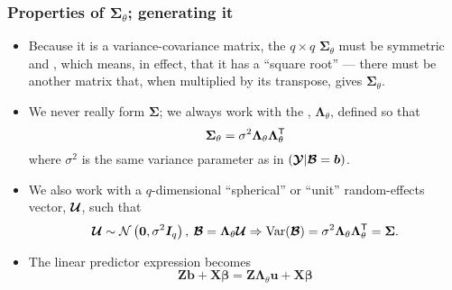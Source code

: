 \documentclass[dvipsnames,pdflatex,beamer]{beamer}
\newcommand{\bLt}{\ensuremath{\bm\Lambda_\theta}}
\begin{document}
\begin{frame}
  \frametitle{Properties of $\bm\Sigma_\theta$; generating it}
  \begin{itemize}
  \item Because it is a variance-covariance matrix, the $q\times q$ 
    $\bm\Sigma_\theta$ must be symmetric and , which means, in effect, that it has a ``square
    root'' --- there must be another matrix that, when
    multiplied by its transpose, gives $\bm\Sigma_\theta$.
  \item We never really form $\bm\Sigma$; we always work with the
    , $\bLt$,
    defined so that
    \begin{displaymath}
      \bm\Sigma_\theta=
      \sigma^2\bLt\bLt\trans
    \end{displaymath}
    where $\sigma^2$ is the same variance parameter as in $(\bm{\mathcal{Y}}|\bm{\mathcal{B}}=\bm b)$.
  \item We also work with a $q$-dimensional ``spherical'' or ``unit''
    random-effects vector, $\bm{\mathcal{U}}$, such that
    \begin{displaymath}
      \bc U\sim\mathcal{N}\left(\bm 0,\sigma^2\bm I_q\right),\:
      \bc B=\bLt\bc U\Rightarrow
      \text{Var}(\bc B)=\sigma^2\bLt\bLt\trans=\bm\Sigma .
    \end{displaymath}
  \item The linear predictor expression becomes
    \begin{displaymath}
      \bm Z\bm b+\bm X\bm\beta=
      \bm Z\bLt\bm u+\bm X\bm\beta
    \end{displaymath}
  \end{itemize}
\end{frame}
\end{document}
